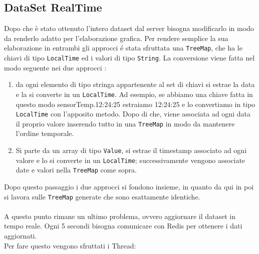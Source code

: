 \subsection{DataSet RealTime}
Dopo che è stato ottenuto l'intero dataset dal server bisogna modificarlo in modo da renderlo adatto per l'elaborazione grafica.
Per rendere semplice la sua elaborazione in entrambi gli approcci é stata sfruttata una \texttt{TreeMap}, che ha le chiavi
di tipo \texttt{LocalTime} ed i valori di tipo \texttt{String}.
La conversione viene fatta nel modo seguente nei due approcci :
\begin{enumerate}
    \item da ogni elemento di tipo stringa appartenente al set di chiavi si estrae la data e la si converte
    in un \texttt{LocalTime}.
    Ad esempio, se abbiamo una chiave fatta in questo modo sensorTemp.12:24:25 estraiamo 12:24:25 e lo convertiamo in tipo \texttt{LocalTime} con l'apposito metodo.
    Dopo di che, viene associata ad ogni data il proprio valore inserendo tutto in una \texttt{TreeMap} in modo da mantenere l'ordine temporale.
    \item Si parte da un array di tipo \texttt{Value}, si estrae il timestamp associato ad ogni valore e lo si converte in un \texttt{LocalTime}; successivamente vengono associate date
    e valori nella \texttt{TreeMap} come sopra.
\end{enumerate}
Dopo questo passaggio i due approcci si fondono insieme, in quanto da qui in poi si lavora sulle \texttt{TreeMap} generate che sono esattamente identiche.\\
\\
A questo punto rimane un ultimo problema, ovvero aggiornare il dataset in tempo reale.
Ogni 5 secondi bisogna comunicare con Redis per ottenere i dati aggiornati.
\\
Per fare questo vengono sfruttati i Thread:


